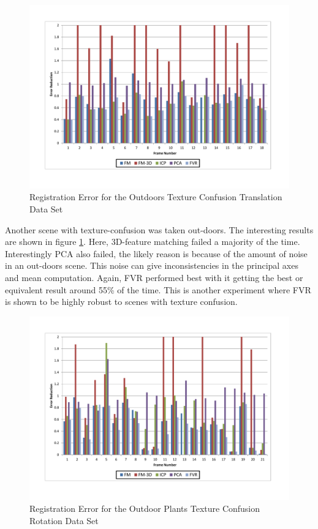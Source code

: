 \begin{figure}[t]
\centering
\includegraphics[width=6.0in]{images/results/Outside_TextureConfusion_Translation}
\caption{Registration Error for the Outdoors Texture Confusion Translation Data Set}
\label{fig:PET16}
\end{figure}

Another scene with texture-confusion was taken out-doors. The interesting results are shown in figure \ref{fig:PET16}. Here, 3D-feature matching failed a majority of the time. Interestingly PCA also failed, the likely reason is because of the amount of noise in an out-doors scene. This noise can give inconsistencies in the principal axes and mean computation. Again, FVR performed best with it getting the best or equivalent result around 55\% of the time. This is another experiment where FVR is shown to be highly robust to scenes with texture confusion. 

\begin{figure}[t]
\centering
\includegraphics[width=6.0in]{images/results/Plants_Outdoors_Texture_Confusion_Rotation}
\caption{Registration Error for the Outdoor Plants Texture Confusion Rotation Data Set}
\label{fig:PET17}
\end{figure}

